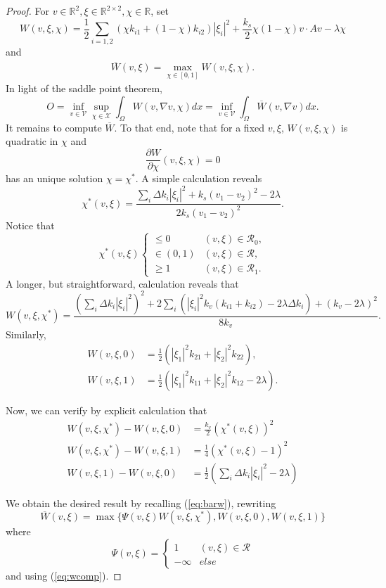 \documentclass[11pt]{article}
\begin{document}
\begin{proof}
For $v \in {\mathbb R}^2, \xi \in {\mathbb R}^{2\times2}, \chi \in {\mathbb R}$, set 
$$
W(v,\xi,\chi) =  \frac{1}{2}
\sum_{i=1,2} (\chi k_{i1} + (1-\chi)k_{i2}) |\xi_i|^2 
+ \frac{k_s}{2} \chi(1-\chi) v \cdot A v -\lambda\chi  
$$
and
\begin{align} \label{eq:barw}
\overline{W}(v,\xi) = \max_{\chi \in [0,1]} W(v,\xi,\chi) .
\end{align}
In light of the saddle point theorem,
$$
O = \inf_{v\in \mathcal{V}}\sup_{\chi\in \mathcal{X}} \int_\Omega W(v, \nabla v, \chi) dx = 
\inf_{v\in \mathcal{V}} \int_\Omega \overline{W} (v,\nabla v) dx.
$$
It remains to compute $\overline{W}$.   To that end, note that for a fixed $v,\xi$, $W(v,\xi,\chi)$ is quadratic in $\chi$ and 
$$
\frac{\partial W}{\partial \chi}(v,\xi,\chi) = 0
$$
has an unique solution $\chi = \chi^*$.  A simple calculation reveals
$$
\chi^*(v,\xi)=\frac{ \sum_i \Delta k_i |\xi_i|^2  + k_s(v_1-v_2)^2 -2 \lambda }{2 k_s (v_1-v_2)^2}.
$$
Notice that 
$$
\chi^*(v,\xi) \begin{cases}
\le 0 & (v,\xi) \in {\mathcal R}_0, \\
\in (0,1) &  (v,\xi) \in {\mathcal R},\\
\ge 1 &  (v,\xi) \in {\mathcal R}_1.
\end{cases}
$$
A longer, but straightforward, calculation reveals that 
$$
W(v,\xi,\chi^*) = \frac{ \left(\sum_i \Delta k_i |\xi_i|^2\right)^2 
+2 \sum_i (|\xi_i|^2 k_v(k_{i1}+k_{i2}) -  2\lambda \Delta k_i)
+ (k_v - 2 \lambda)^2}{8k_v} .
$$ 
Similarly, 
\begin{align*}
W(v,\xi,0) &= \frac{1}{2} \left(|\xi_1|^2 k_{21}+|\xi_2|^2 k_{22} \right), \\
W(v,\xi,1) &= \frac{1}{2} \left(|\xi_1|^2 k_{11}+|\xi_2|^2 k_{12}-2 \lambda \right) .
\end{align*}

Now, we can verify by explicit calculation that 
\begin{align} \label{eq:wcomp}
W(v,\xi, \chi^*) - W(v,\xi, 0) &= \frac{k_v}{2} (\chi^*(v,\xi))^2  \nonumber \\
W(v,\xi, \chi^*) - W(v,\xi, 1) &= \frac{1}{4} (\chi^*(v,\xi)-1 )^2 \\
W(v,\xi, 1) - W(v,\xi, 0) &= \frac{1}{2} \left( \sum_i \Delta k_i |\xi_i|^2 - 2 \lambda \right)  \nonumber 
\end{align}

We obtain the desired result by recalling (\ref{eq:barw}), rewriting
$$
\overline{W} (v,\xi) = \max \{ \Psi(v,\xi) W(v,\xi, \chi^*), W(v,\xi, 0), W(v,\xi,1) \}
$$
where 
$$
\Psi(v,\xi) = \begin{cases}
1 & (v,\xi) \in {\mathcal R}\\
- \infty & else
\end{cases}
$$
and using (\ref{eq:wcomp}).


\end{proof}
\end{document}
